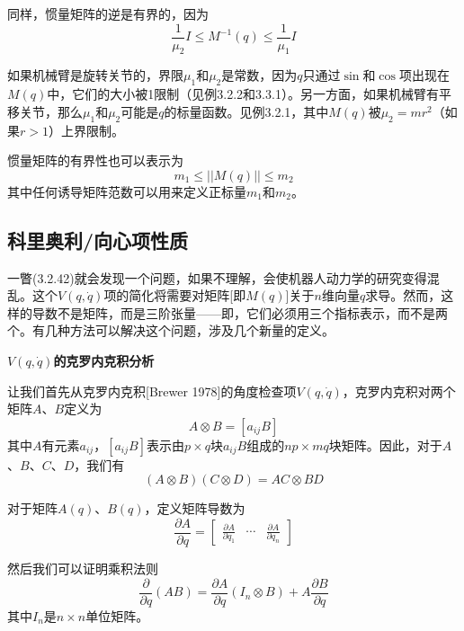 \documentclass[12pt,a4paper]{ctexart}
\begin{document}
同样，惯量矩阵的逆是有界的，因为
\begin{equation}
\frac{1}{\mu_2} I \leq M^{-1}(q) \leq \frac{1}{\mu_1} I
\end{equation}

如果机械臂是旋转关节的，界限$\mu_1$和$\mu_2$是常数，因为$q$只通过$\sin$和$\cos$项出现在$M(q)$中，它们的大小被1限制（见例3.2.2和3.3.1）。另一方面，如果机械臂有平移关节，那么$\mu_1$和$\mu_2$可能是$q$的标量函数。见例3.2.1，其中$M(q)$被$\mu_2 = mr^2$（如果$r > 1$）上界限制。

惯量矩阵的有界性也可以表示为
\begin{equation}
m_1 \leq ||M(q)|| \leq m_2
\end{equation}
其中任何诱导矩阵范数可以用来定义正标量$m_1$和$m_2$。

\subsection{科里奥利/向心项性质}

一瞥(3.2.42)就会发现一个问题，如果不理解，会使机器人动力学的研究变得混乱。这个$V(q,\dot{q})$项的简化将需要对矩阵[即$M(q)$]关于$n$维向量$q$求导。然而，这样的导数不是矩阵，而是三阶张量——即，它们必须用三个指标表示，而不是两个。有几种方法可以解决这个问题，涉及几个新量的定义。

\textbf{$V(q,\dot{q})$的克罗内克积分析}

让我们首先从克罗内克积[Brewer 1978]的角度检查项$V(q,\dot{q})$，克罗内克积对两个矩阵$A$、$B$定义为
\begin{equation}
A \otimes B = [a_{ij}B]
\end{equation}
其中$A$有元素$a_{ij}$，$[a_{ij}B]$表示由$p \times q$块$a_{ij}B$组成的$np \times mq$块矩阵。因此，对于$A$、$B$、$C$、$D$，我们有
\begin{equation}
(A \otimes B)(C \otimes D) = AC \otimes BD
\end{equation}

对于矩阵$A(q)$、$B(q)$，定义矩阵导数为
\begin{equation}
\frac{\partial A}{\partial q} = \begin{bmatrix} \frac{\partial A}{\partial q_1} & \cdots & \frac{\partial A}{\partial q_n} \end{bmatrix}
\end{equation}

然后我们可以证明乘积法则
\begin{equation}
\frac{\partial}{\partial q}(AB) = \frac{\partial A}{\partial q}(I_n \otimes B) + A\frac{\partial B}{\partial q}
\end{equation}
其中$I_n$是$n \times n$单位矩阵。
\end{document}
